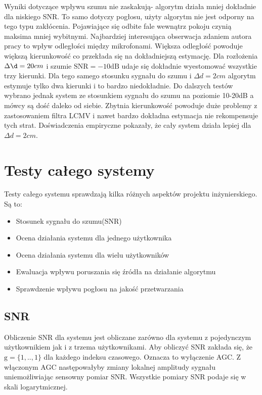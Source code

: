 \noindent Wyniki dotyczące wpływu szumu nie zaskakują- algorytm działa mniej dokładnie dla niskiego SNR. To samo dotyczy pogłosu, użyty algorytm nie jest odporny na tego typu zakłócenia. Pojawiające się odbite fale wewnątrz pokoju czynią maksima mniej wybitnymi. Najbardziej interesująca obserwacja zdaniem autora pracy to wpływ odległości między mikrofonami. Większa odległość powoduje większą kierunkowość co przekłada się na dokładniejszą estymację. Dla rozłożenia $\Delta \d = 20cm$ i szumie $\mathrm{SNR}=-10\mathrm{dB}$ udaje się dokładnie wyestomować wszystkie trzy kierunki. Dla tego samego stosunku sygnału do szumu i $\Delta d = 2cm$ algorytm estymuje tylko dwa kierunki i to bardzo niedokładnie. Do dalszych testów wybrano jednak system ze stosunkiem sygnału do szumu na poziomie 10-20dB a mówcy są dość daleko od siebie. Zbytnia kierunkowość powoduje duże problemy z zastosowaniem filtra LCMV i nawet bardzo dokładna estymacja nie rekompensuje tych strat. Doświadczenia empiryczne pokazały, że cały system działa lepiej dla $\Delta d = 2cm$.

\newpage

\section{Testy całego systemy}

Testy całego systemu sprawdzają kilka różnych aspektów projektu inżynierskiego. Są to:

\begin{itemize}
    \item Stosunek sygnału do szumu(SNR)
    \item Ocena działania systemu dla jednego użytkownika
    \item Ocena działania systemu dla wielu użytkowników
    \item Ewaluacja wpływu poruszania się źródła na działanie algorytmu
    \item Sprawdzenie wpływu pogłosu na jakość przetwarzania
    
\end{itemize}
\subsection{SNR}

Obliczenie SNR dla systemu jest obliczane zarówno dla systemu z pojedynczym użytkownikiem jak i z trzema użytkownikami. Aby obliczyć SNR zakłada się, że $\bm{\mathrm{g}} = \{1,..,1\}$ dla każdego indeksu czasowego. Oznacza to wyłączenie AGC. Z włączonym AGC następowałyby zmiany lokalnej amplitudy sygnału uniemożliwiając sensowny pomiar SNR. Wszystkie pomiary SNR podaje się w skali logarytmicznej.

